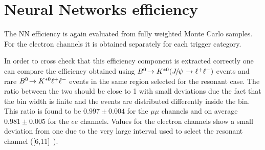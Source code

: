 \section{Neural Networks efficiency}
\label{sec:Rkst_mva_eff}

The NN efficiency is again evaluated from fully weighted Monte Carlo samples. 
For the electron channels it is obtained separately for each trigger category.

In order to cross check that this efficiency component is extracted correctly
one can compare the efficiency obtained using $\decay{\Bz}{\Kstarz(\jpsi\to\ll)}$ events
and rare ${{B}^0}\!\rightarrow {\ensuremath{{K}^{*0}}} \ell^+ \ell^-$ events in the same \qsq region selected
for the resonant case. The ratio between the two should be close to 1 with
small deviations due the fact that the bin width is finite and the events are distributed
differently inside the bin. This ratio is found to be $ 0.997  \pm  0.004 $ for the
$\mu\mu$ channels and on average $0.981  \pm  0.005$ for the $ee$ channels.
Values for the electron channels show a small deviation from one due to the very large
\qsq interval used to select the resonant channel ([6,11]~\gevgevcccc).



\clearpage








